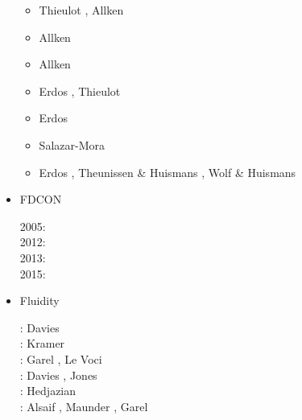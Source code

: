 \begin{itemize}
\begin{scriptsize}
\begin{itemize}
\item[\twothousandeleven]   Thieulot \cite{thie11}, Allken \etal \cite{alht11}
\item[\twothousandtwelve]   Allken \etal \cite{alht12}
\item[\twothousandthirteen] Allken \etal \cite{alhf13}
\item[\twothousandfourteen] Erdos \etal \cite{erhv14}, Thieulot \etal \cite{thsh14}
\item[\twothousandfifteen]  Erdos \etal \cite{erhv15}
\item[\twothousandeighteen] Salazar-Mora \etal \cite{sahf18}
\item[\twothousandnineteen] Erdos \etal \cite{erhv19}, Theunissen \& Huismans \cite{thhu19}, 
                            Wolf \& Huismans \cite{wohu19}
\end{itemize}
\end{scriptsize}

\item FDCON 

\begin{scriptsize}
2005: \cite{enbs05}\\
2012: \cite{crsg12}\\
2013: \cite{fusc13}\\
2015: \cite{fuks15}
\end{scriptsize}

\item Fluidity 

\begin{scriptsize}
\noindent
\twothousandeleven: Davies \etal \cite{dawk11}\\
\twothousandtwelve: Kramer \etal \cite{krwd12}\\
\twothousandfourteen: Garel \etal \cite{gagd14}, Le Voci \etal \cite{ledg14}\\
\twothousandsixteen: Davies \etal \cite{dalg16}, Jones \etal \cite{jodc16} \\
\twothousandseventeen: Hedjazian \etal \cite{hegd17}\\
\twothousandtwenty: Alsaif \etal \cite{algg20}, Maunder \etal \cite{mapg20}, 
                    Garel \etal \cite{gatt20}
\end{scriptsize}


\end{itemize}
